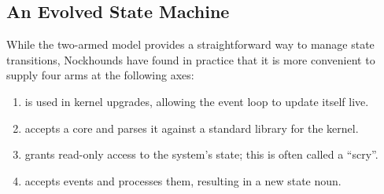 \subsection{An Evolved State Machine}

While the two-armed model provides a straightforward way to manage state transitions, Nockhounds have found in practice that it is more convenient to supply four arms at the following axes:

\begin{enumerate}
  \item[\textct{+4}:]  is used in kernel upgrades, allowing the event loop to update itself live.
  \item[\textct{+10}:]  accepts a core and parses it against a standard library for the kernel.
  \item[\textct{+22}:]  grants read-only access to the system's state; this is often called a ``scry''.
  \item[\textct{+23}:]  accepts events and processes them, resulting in a new state noun.
\end{enumerate}
